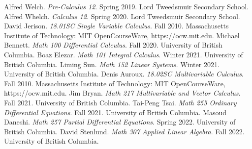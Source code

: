 \begin{thebibliography}{20}
     Alfred Welch. \textit{Pre-Calculus 12}. Spring 2019. Lord Tweedsmuir Secondary School.
     Alfred Whelch. \textit{Calculus 12}. Spring 2020. Lord Tweedsmuir Secondary School.
     David Jerison. \textit{18.01SC Single Variable Calculus}. Fall 2010. Massachusetts Institute of Technology: MIT OpenCourseWare, https://ocw.mit.edu.
     Michael Bennett. \textit{Math 100 Differential Calculus}. Fall 2020. University of British Columbia.
     Boaz Elezar. \textit{Math 101 Integral Calculus}. Winter 2021. University of British Columbia.
     Liming Sun. \textit{Math 152 Linear Systems}. Winter 2021. University of British Columbia.
     Denis Auroux. \textit{18.02SC Multivariable Culculus}. Fall 2010. Massachusetts Institute of Technology: MIT OpenCourseWare, https://ocw.mit.edu.
     Jim Bryan. \textit{Math 217 Multivariable and Vector Calculus}. Fall 2021. University of British Columbia.
     Tai-Peng Tsai. \textit{Math 255 Ordinary Differential Equations}. Fall 2021. University of British Columbia.
     Masoud Daneshi. \textit{Math 257 Partial Differential Equations}. Spring 2022. University of British Columbia.
     David Stenlund. \textit{Math 307 Applied Linear Algebra}. Fall 2022. University of British Columbia.
    \end{thebibliography}